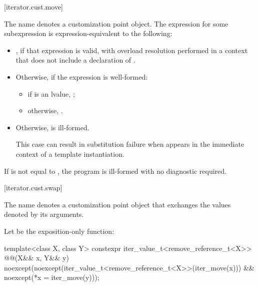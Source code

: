 [iterator.cust.move]{}

%
\pnum
The name  denotes
a customization point object.
The expression  for some subexpression  is
expression-equivalent to the following:

\begin{itemize}
\item {}, if that expression is valid, with overload
resolution performed in a context that does not include a declaration of
.

\item Otherwise, if the expression  is well-formed:
\begin{itemize}
\item if  is an lvalue, ;

\item otherwise, .
\end{itemize}

\item Otherwise,  is ill-formed.
\begin{note}
This case can result in substitution failure when 
appears in the immediate context of a template instantiation.
\end{note}
\end{itemize}

\pnum
If  is not equal to , the program is
ill-formed with no diagnostic required.

[iterator.cust.swap]{}

%
\pnum
The name  denotes
a customization point object
that exchanges the values denoted by its
arguments.

\pnum
Let  be the exposition-only function:
\begin{itemdecl}
template<class X, class Y>
  constexpr iter_value_t<remove_reference_t<X>> @@(X&& x, Y&& y)
    noexcept(noexcept(iter_value_t<remove_reference_t<X>>(iter_move(x))) &&
      noexcept(*x = iter_move(y)));
\end{itemdecl}

